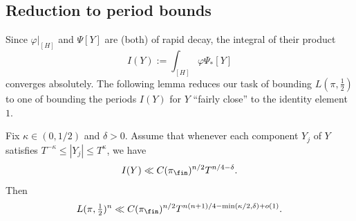 \subsection{Reduction to period bounds}\label{sec:reduct-peri-bounds}
Since $\varphi|_{[H]}$ and $\Psi[Y]$ are (both) of rapid decay, the integral of their product
\begin{equation*}
  I(Y) := \int_{[H]} \varphi \Psi_{\ast}[Y]
\end{equation*}
converges absolutely.  The following lemma reduces our task of bounding $L(\pi,\tfrac{1}{2})$ to one of bounding the periods $I(Y)$ for $Y$ ``fairly close'' to the identity element $1$.

\begin{lemma}\label{lem:sub-gln:fix-kappa-in}
  Fix $\kappa \in (0,1/2)$ and $\delta > 0$.  Assume that whenever each component $Y_j$ of $Y$ satisfies $T^{-\kappa} \leq |Y_j| \leq T^{\kappa}$, we have
  \begin{equation}\label{eq:iy-ll-tn4}
    I(Y) \ll C(\pi_{\fin})^{n/2} T^{n/4 -\delta}.
  \end{equation}
  Then
  \begin{equation}\label{eq:lpi-tfrac12n-ll_eps}
    L(\pi,\tfrac{1}{2})^{n} \ll
    C(\pi_{\fin})^{n/2}
    T^{n(n+1)/4 - \min(\kappa/2,\delta) + o(1)}.
  \end{equation}
\end{lemma}
